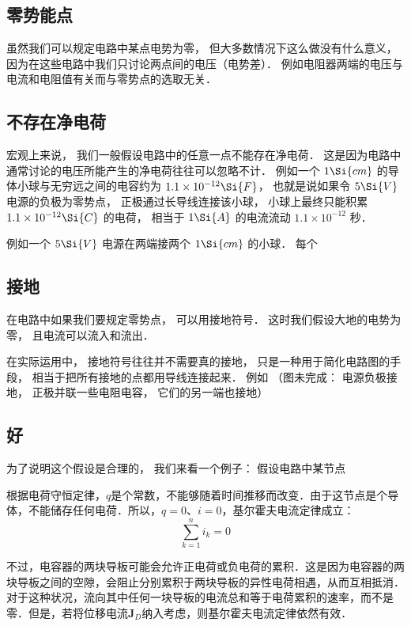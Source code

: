 

\subsection{零势能点}
虽然我们可以规定电路中某点电势为零， 但大多数情况下这么做没有什么意义， 因为在这些电路中我们只讨论两点间的电压（电势差）． 例如电阻器两端的电压与电流和电阻值有关而与零势点的选取无关．

\subsection{不存在净电荷}
宏观上来说， 我们一般假设电路中的任意一点不能存在净电荷． 这是因为电路中通常讨论的电压所能产生的净电荷往往可以忽略不计． 例如一个 $1\Si{cm}$ 的导体小球与无穷远之间的电容约为 $1.1\times 10^{-12} \Si{F}$， 也就是说如果令 $5\Si{V}$ 电源的负极为零势点， 正极通过长导线连接该小球， 小球上最终只能积累 $1.1\times 10^{-12} \Si{C}$ 的电荷， 相当于 $1\Si{A}$ 的电流流动 $1.1\times 10^{-12}$ 秒．



例如一个 $5\Si{V}$ 电源在两端接两个 $1\Si{cm}$ 的小球． 每个

\subsection{接地}
在电路中如果我们要规定零势点， 可以用接地符号． 这时我们假设大地的电势为零， 且电流可以流入和流出．

在实际运用中， 接地符号往往并不需要真的接地， 只是一种用于简化电路图的手段， 相当于把所有接地的点都用导线连接起来． 例如
（图未完成： 电源负极接地， 正极并联一些电阻电容， 它们的另一端也接地）




\subsection{好}

为了说明这个假设是合理的， 我们来看一个例子： 假设电路中某节点



根据电荷守恒定律，$q$是个常数，不能够随着时间推移而改变．由于这节点是个导体，不能储存任何电荷．所以，$q=0$、$i=0$，基尔霍夫电流定律成立：
\begin{equation}
\sum_{k=1}^n i_k =0
\end{equation}

不过，电容器的两块导板可能会允许正电荷或负电荷的累积．这是因为电容器的两块导板之间的空隙，会阻止分别累积于两块导板的异性电荷相遇，从而互相抵消．对于这种状况，流向其中任何一块导板的电流总和等于电荷累积的速率，而不是零．但是，若将位移电流$\mathbf{J}_D$纳入考虑，则基尔霍夫电流定律依然有效．

